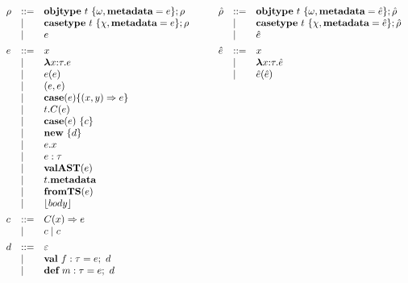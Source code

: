 \begin{figure}[t]
\centering
\[
\begin{array}[t]{lll} 
\rho & \bnfdef & \keyw{objtype}~ t~ \{ \omega, \keyw{metadata}=e \}; \rho \\
     & \bnfalt & \keyw{casetype}~ t~ \{ \chi, \keyw{metadata}=e \}; \rho\\
     & \bnfalt & e
     \\[1ex]
e    & \bnfdef & x \\
     & \bnfalt & \boldsymbol\lambda x{:}\tau . e \\ %
     & \bnfalt & e(e) \\
     & \bnfalt & (e, e) \\
     & \bnfalt & \keyw{case}(e) \{(x, y) \Rightarrow e\}\\
     & \bnfalt & t.C(e) \\
     & \bnfalt & \keyw{case}(e)~\{ c \} \\
     & \bnfalt & \keyw{new}~ \{ d \}\\
     & \bnfalt & e.x \\
     & \bnfalt & e : \tau\\
     & \bnfalt & \keyw{valAST}(e) \\
     & \bnfalt & t.\keyw{metadata}\\
     & \bnfalt & \keyw{fromTS}(e)\\
     & \bnfalt & \lfloor body \rfloor
\\[1ex]	
c    & \bnfdef & C(x) \Rightarrow e\\
     & \bnfalt & c \bnfalt c
	 \\[1ex]
d   & \bnfdef & \varepsilon \\
     & \bnfalt & \keyw{val}~ f:\tau = e;~d \\
     & \bnfalt & \keyw{def}~ m:\tau = e;~d
\end{array}
\begin{array}[t]{lll}
~~~
\end{array}
\begin{array}[t]{lll}
\hat\rho & \bnfdef & \keyw{objtype}~ t~ \{ \omega, \keyw{metadata}=\hat e \}; \hat\rho \\
     & \bnfalt & \keyw{casetype}~ t~ \{ \chi, \keyw{metadata}=\hat e \}; \hat\rho\\
     & \bnfalt & \hat e
     \\[1ex]
\hat{e}    & \bnfdef & x \\
     & \bnfalt & \boldsymbol\lambda x{:}\tau . \hat{e} \\ %
     & \bnfalt & \hat{e}(\hat{e}) \\

\end{array}\]
\end{figure}
